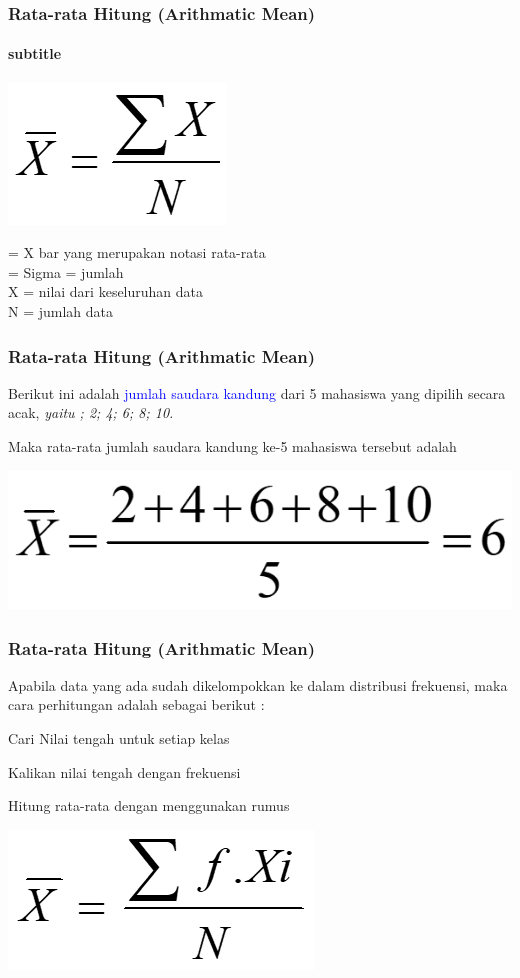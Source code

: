 \documentclass[main.tex]{subfiles}
\begin{document}
\begin{frame}[c]
	\frametitle{Rata-rata Hitung (Arithmatic Mean)}
	\framesubtitle{subtitle}
	\begin{center}
		\includegraphics[scale=.5]{figures/mean1}
	\end{center}

	= X bar yang merupakan notasi rata-rata\\
	= Sigma = jumlah\\
	X = nilai dari keseluruhan data\\
	N = jumlah data\\
\end{frame}
\begin{frame}[c]
	\frametitle{Rata-rata Hitung (Arithmatic Mean)}
	Berikut ini adalah \textcolor{blue}{jumlah saudara kandung} dari 5 mahasiswa yang dipilih secara acak, \textit{yaitu ; 2; 4; 6; 8; 10.}

	Maka rata-rata jumlah saudara kandung ke-5 mahasiswa tersebut adalah

	\begin{center}
		\includegraphics[scale=0.5]{figures/mean2}
	\end{center}


\end{frame}

\begin{frame}[c]
	\frametitle{Rata-rata Hitung (Arithmatic Mean)}

	Apabila data yang ada sudah {\Large dikelompokkan} ke dalam distribusi frekuensi, maka cara perhitungan adalah sebagai berikut :

	Cari Nilai tengah untuk setiap kelas

	Kalikan nilai tengah dengan frekuensi

	Hitung rata-rata dengan menggunakan rumus

	\begin{center}
		\includegraphics[scale=.5]{figures/mean3}
	\end{center}
\end{frame}
\end{document}
